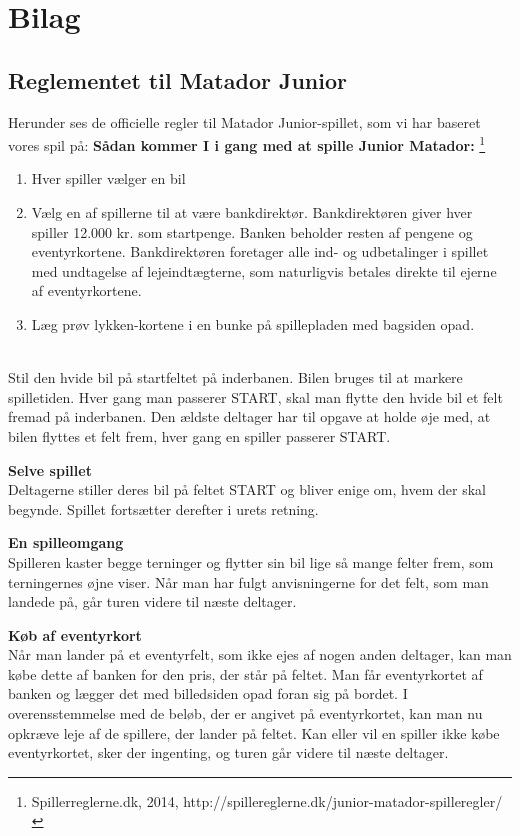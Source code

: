 \chapter{Bilag}

\section{Reglementet til Matador Junior}
Herunder ses de officielle regler til Matador Junior-spillet, som vi har baseret vores spil på:
\textbf{Sådan kommer I i gang med at spille Junior Matador:} \footnote{Spillerreglerne.dk, 2014, http://spillereglerne.dk/junior-matador-spilleregler/}
\\
\begin{enumerate}
    \item Hver spiller vælger en bil
    \item Vælg en af spillerne til at være bankdirektør. 
    Bankdirektøren giver hver spiller 12.000 kr. som startpenge. 
    Banken beholder resten af pengene og eventyrkortene. 
    Bankdirektøren foretager alle ind- og udbetalinger i spillet med undtagelse af lejeindtægterne, som naturligvis betales direkte til ejerne af eventyrkortene.
    \item Læg prøv lykken-kortene i en bunke på spillepladen med bagsiden opad.
\end{enumerate}
\\Stil den hvide bil på startfeltet på inderbanen. 
Bilen bruges til at markere spilletiden.
Hver gang man passerer START, skal man flytte den hvide bil et felt fremad på inderbanen. 
Den ældste deltager har til opgave at holde øje med, at bilen flyttes et felt frem, hver gang en spiller passerer START.

\textbf{Selve spillet}
\\Deltagerne stiller deres bil på feltet START og bliver enige om, hvem der skal begynde. 
Spillet fortsætter derefter i urets retning.

\textbf{En spilleomgang}
\\Spilleren kaster begge terninger og flytter sin bil lige så mange felter frem, som terningernes øjne viser. 
Når man har fulgt anvisningerne for det felt, som man landede på, går turen videre til næste deltager.

\textbf{Køb af eventyrkort}
\\Når man lander på et eventyrfelt, som ikke ejes af nogen anden deltager, kan man købe dette af banken for den pris, der står på feltet. 
Man får eventyrkortet af banken og lægger det med billedsiden opad foran sig på bordet. 
I overensstemmelse med de beløb, der er angivet på eventyrkortet, kan man nu opkræve leje af de spillere, der lander på feltet. 
Kan eller vil en spiller ikke købe eventyrkortet, sker der ingenting, og turen går videre til næste deltager.

